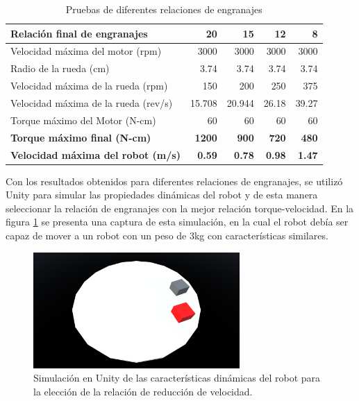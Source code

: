 \begin{table}[htbp]
	\caption{Pruebas de diferentes relaciones de engranajes}
	\begin{tabular}{|l|r|r|r|r|}
		\hline
		\textbf{Relación final de engranajes} & \textbf{20} & \textbf{15} & \textbf{12} & \textbf{8} \\ \hline
		Velocidad máxima del motor (rpm) & 3000 & 3000 & 3000 & 3000 \\ \hline
		Radio de la rueda (cm) & 3.74 & 3.74 & 3.74 & 3.74 \\ \hline
		Velocidad máxima de la rueda (rpm) & 150 & 200 & 250 & 375 \\ \hline
		Velocidad máxima de la rueda (rev/s) & 15.708 & 20.944 & 26.18 & 39.27 \\ \hline
		Torque máximo del Motor (N-cm) & 60 & 60 & 60 & 60 \\ \hline
		\textbf{Torque máximo final (N-cm)} & \textbf{1200} & \textbf{900} & \textbf{720} & \textbf{480} \\ \hline
		\textbf{Velocidad máxima del robot (m/s)} & \textbf{0.59} & \textbf{0.78} & \textbf{0.98} & \textbf{1.47} \\ \hline
	\end{tabular}
	\label{TablaPruebaEngranajes}
\end{table}



Con los resultados obtenidos para diferentes relaciones de engranajes, se utilizó Unity para simular las propiedades dinámicas del robot y de esta manera seleccionar la relación de engranajes con la mejor relación torque-velocidad. En la figura \ref{imagen:prototipo/SimulacionUnity} se presenta una captura de esta simulación, en la cual el robot debía ser capaz de mover a un robot con un peso de 3kg con características similares.



\begin{figure}[H]
	\centering
	\includegraphics[width=0.7\textwidth]{imagenes/prototipo/SimulacionUnity}
	\caption{Simulación en Unity de las características dinámicas del robot para la elección de la relación de reducción de velocidad.}
	\label{imagen:prototipo/SimulacionUnity}
\end{figure}

